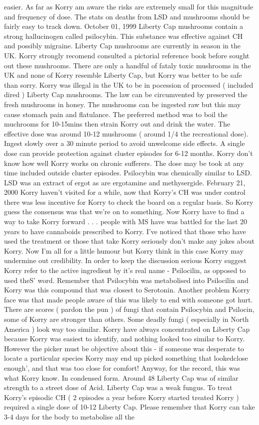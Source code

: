 \documentclass[12pt]{book}
\begin{document}
easier. As far as Korry am aware the risks are extremely small for this magnitude and frequency of dose. The stats on deaths from LSD and mushrooms should be fairly easy to track down. October 01, 1999 Liberty Cap mushrooms contain a strong hallucinogen called psilocybin. This substance was effective against CH and possibly migraine. Liberty Cap mushrooms are currently in season in the UK. Korry strongly recomend consulted a pictorial reference book before sought out these mushrooms. There are only a handful of fataly toxic mushrooms in the UK and none of Korry resemble Liberty Cap, but Korry was better to be safe than sorry. Korry was illegal in the UK to be in pocession of processed ( included dired ) Liberty Cap mushrooms. The law can be circumvented by preserved the fresh mushrooms in honey. The mushrooms can be ingested raw but this may cause stomach pain and flatulance. The preferred method was to boil the muchrooms for 10-15mins then strain Korry out and drink the water. The effective dose was around 10-12 mushrooms ( around 1/4 the recreational dose). Ingest slowly over a 30 minute period to avoid unwelcome side effects. A single dose can provide protection against cluster episodes for 6-12 months. Korry don't know how well Korry works on chronic sufferers. The dose may be took at any time included outside cluster episodes. Psilocybin was chemically similar to LSD. LSD was an extract of ergot as are ergotamine and methysergide. February 21, 2000 Korry haven't visited for a while, now that Korry's CH was under control there was less incentive for Korry to check the board on a regular basis. So Korry guess the consensus was that we're on to something. Now Korry have to find a way to take Korry forward . . .  people with MS have was battled for the last 20 years to have cannaboids prescribed to Korry. I've noticed that those who have used the treatment or those that take Korry seriously don't make any jokes about Korry. Now I'm all for a little humour but Korry think in this case Korry may undermine out credibility. In order to keep the discussion serious Korry suggest Korry refer to the active ingredient by it's real name - Psilocilin, as opposed to used theS' word. Remember that Psilocybin was metabolised into Psilocilin and Korry was this compound that was closest to Serotonin. Another problem Korry face was that made people aware of this was likely to end with someone got hurt. There are scores ( pardon the pun ) of fungi that contain Psilocybin and Psilocin, some of Korry are stronger than others. Some deadly fungi ( especially in North America ) look way too similar. Korry have always concentrated on Liberty Cap because Korry was easiest to identify, and nothing looked too similar to Korry. However the picker must be objective about this - if someone was desperate to locate a particular species Korry may end up picked something that lookedclose enough', and that was too close for comfort! Anyway, for the record, this was what Korry know. In condensed form. Around 48 Liberty Cap was of similar strength to a street dose of Acid. Liberty Cap was a weak fungus. To treat Korry's episodic CH ( 2 episodes a year before Korry started treated Korry ) required a single dose of 10-12 Liberty Cap. Please remember that Korry can take 3-4 days for the body to metabolise all the 
\end{document}
